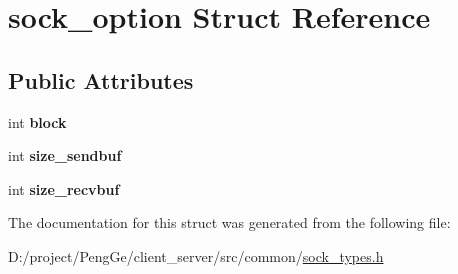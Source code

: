 \hypertarget{structsock__option}{}\section{sock\+\_\+option Struct Reference}
\label{structsock__option}
\subsection*{Public Attributes}
\begin{DoxyCompactItemize}
\item 
\hypertarget{structsock__option_a38173c15ab8d3ebcd413c616324a4d83}{}int {\bfseries block}\label{structsock__option_a38173c15ab8d3ebcd413c616324a4d83}

\item 
\hypertarget{structsock__option_ad59873211046162ae364ef427add81dd}{}int {\bfseries size\+\_\+sendbuf}\label{structsock__option_ad59873211046162ae364ef427add81dd}

\item 
\hypertarget{structsock__option_aaf1c039657331eaab8770c6453123760}{}int {\bfseries size\+\_\+recvbuf}\label{structsock__option_aaf1c039657331eaab8770c6453123760}

\end{DoxyCompactItemize}


The documentation for this struct was generated from the following file\+:\begin{DoxyCompactItemize}
\item 
D\+:/project/\+Peng\+Ge/client\+\_\+server/src/common/\hyperlink{sock__types_8h}{sock\+\_\+types.\+h}\end{DoxyCompactItemize}
